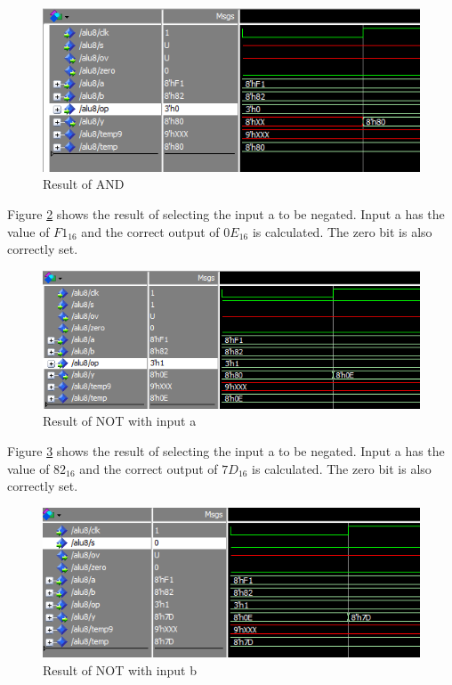 \documentclass[12pt]{article}
\begin{document}
\begin{figure}[H]
\centering
\includegraphics[width=1\linewidth]{and}
\caption{Result of AND}
\label{fig:and}
\end{figure}

Figure \ref{fig:not-a} shows the result of selecting the input a to be negated. Input a has the value of $F1_{16}$ and the correct output of $0E_{16}$ is calculated. The zero bit is also correctly set.

\begin{figure}[H]
\centering
\includegraphics[width=1\linewidth]{not-a}
\caption{Result of NOT with input a}
\label{fig:not-a}
\end{figure}

Figure \ref{fig:not-b} shows the result of selecting the input a to be negated. Input a has the value of $82_{16}$ and the correct output of $7D_{16}$ is calculated. The zero bit is also correctly set.
\begin{figure}[H]
\centering
\includegraphics[width=1\linewidth]{not-b}
\caption{Result of NOT with input b}
\label{fig:not-b}
\end{figure}
\end{document}
